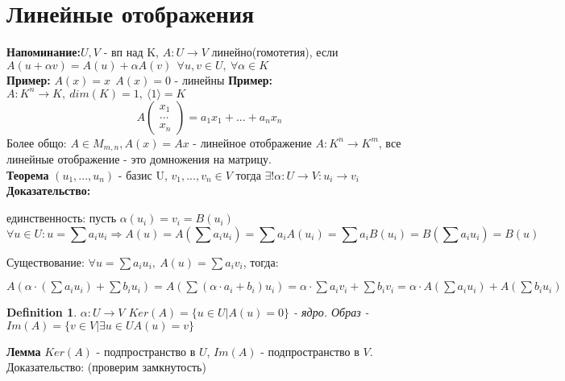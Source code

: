 \documentclass[12pt]{article}
\newtheorem{definition}{Definition}
\begin{document}
 \section{Линейные отображения}
 \textbf{Напоминание:}$ U, V$ - вп над K, $A : U \rightarrow V$ линейно(гомотетия), если $A(u + \alpha v) = A(u) + \alpha A(v) \ \ \forall u, v \in U, \ \forall \alpha \in K$
\\
 \textbf{Пример:} $A(x) = x \ \ A(x) = 0$ - линейны
 \textbf{Пример:} $A: K^n \rightarrow K, \ dim(K) = 1, \ \langle1\rangle = K$ $$A\begin{pmatrix}
     x_1 \\
     ... \\
     x_n
 \end{pmatrix} = a_1x_1 + ... + a_nx_n$$
 Более общо: $A \in M_{m, n}, A(x) = Ax$ - линейное отображение $A: K^n \rightarrow K^m$, все линейные отображение - это домножения на матрицу.
 \\
 \textbf{Теорема} $(u_1, ..., u_n)$ - базис U, $v_1, ..., v_n \in V$ тогда $\exists ! \alpha: U \rightarrow V: u_i \rightarrow v_i$
  \textbf{Доказательство:}
  
  единственность: пусть $\alpha(u_i) = v_i = B(u_i)$ $$\forall u\in U: u=\sum a_iu_i\Rightarrow A(u)=A(\sum a_iu_i)=\sum a_iA(u_i)=\sum a_iB(u_i)=B(\sum a_iu_i)=B(u)$$
  
  Существование: $\forall u = \sum a_i u_i, \ A(u) = \sum a_i v_i$, тогда:
  
  $A(\alpha\cdot (\sum a_iu_i)+\sum b_iu_i)=A(\sum(\alpha\cdot a_i+b_i)u_i)=\alpha\cdot \sum a_iv_i+\sum b_iv_i=\alpha \cdot A(\sum a_iu_i)+A(\sum b_iu_i)
$  \\
  \begin{definition}
      $\alpha : U \rightarrow V$ $Ker(A) = \{ u \in U | A(u) = 0\}$ - ядро. Образ - $Im(A) = \{v \in V | \exists u \in U A(u) = v \}$
  \end{definition} 
  \textbf{Лемма} $Ker(A)$ - подпространство в $U$, $Im(A)$ - подпространство в $V$.
  Доказательство: (проверим замкнутость)
  
\end{document}
